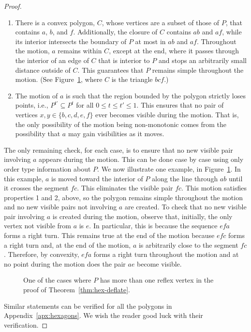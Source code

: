 \documentclass{patmorin}
\begin{document}
\begin{proof}
  \begin{enumerate}
  \item There is a convex polygon, $C$, whose vertices are a subset of
    those of $P$, that contains $a$, $b$, and $f$.  Additionally, the
    closure of $C$ contains $ab$ and $af$, while its interior
    intersects the boundary of $P$ at most in $ab$ and $af$.
    Throughout the motion, $a$ remains within $C$, except at the end,
    where it passes through the interior of an edge of $C$ that is
    interior to $P$ and stops an arbitrarily small distance outside of
    $C$. This guarantees that $P$ remains simple throughout the
    motion.  (See Figure~\ref{fig:hexdef-example}, where $C$ is the
    triangle $bcf$.)
  
  \item
    The motion of $a$ is such that the region bounded by the polygon
    strictly loses points, i.e., $P^{t'} \subseteq P^t$ for all $0\le
    t\le t'\le 1$.  This ensures that no pair of vertices
    $x,y\in\{b,c,d,e,f\}$ ever becomes visible during the motion.
    That is, the only possibility of the motion being non-monotonic
    comes from the possibility that $a$ may gain visibilities as it
    moves.
  \end{enumerate}

  The only remaining check, for each case, is to ensure that no new
  visible pair involving $a$ appears during the motion. This can be
  done case by case using only order type information about $P$.  We
  now illustrate one example, in Figure~\ref{fig:hexdef-example}.  In
  this example, $a$ is moved toward the interior of $P$ along the line
  through $ab$ until it crosses the segment $fc$.  This eliminates the
  visible pair $fc$.  This motion satisfies properties 1 and 2, above,
  so the polygon remains simple throughout the motion and no new
  visible pairs not involving $a$ are created.  To check that no new
  visible pair involving $a$ is created during the motion, observe
  that, initially, the only vertex not visible from $a$ is $e$.  In
  particular, this is because the sequence $efa$ forms a right turn.
  This remains true at the end of the motion because $efc$ forms a
  right turn and, at the end of the motion, $a$ is arbitrarily close
  to the segment $fc$.  Therefore, by convexity, $efa$ forms a right
  turn throughout the motion and at no point during the motion does
  the pair $ae$ become visible.

  \begin{figure}[htb]
    \centering
    \quad
    \caption{One of the cases where $P$ has more than one reflex
      vertex in the proof of Theorem~\ref{thm:hex-deflate}.}
    \label{fig:hexdef-example}
  \end{figure}

  Similar statements can be verified for all the polygons in
  Appendix~\ref{apx:hexagons}.  We wish the reader good luck with
  their verification.
\end{proof}
\end{document}
